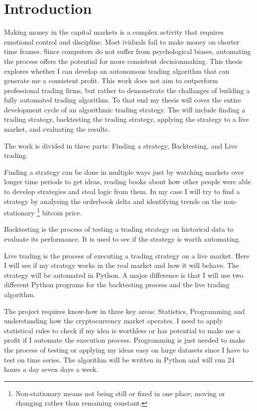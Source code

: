 \documentclass[12pt]{article}
\begin{document}
\section{Introduction}
Making money in the capital markets is a complex activity that requires emotional control and discipline. Most ividuals fail to make money on shorter time frames. Since computers do not suffer from psychological biases, automating the process offers the potential for more consistent decisionmaking. This thesis explores whether I can develop an autonomous trading algorithm that can generate me a consistent profit. 
This work does not aim to outperform professional trading firms, but rather to demonstrate the challanges of building a fully automated trading algorithm.
To that end my thesis will cover the entire development cycle of an algorithmic trading strategy. The will include finding a trading strategy, backtesting the trading strategy, applying the strategy to a live market, and evaluating the results.



The work is divided in three parts: Finding a strategy, Backtesting, and Live trading.

Finding a strategy can be done in multiple ways just by watching markets over longer time periods to get ideas, reading books about how other people were able to develop strategies and steal logic from them. In my case I will try to find a strategy by analysing the orderbook delta and identifying trends on the non-stationary \footnote{Non-stationary means not being still or fixed in one place; moving or changing rather than remaining constant.} bitcoin price. 

Backtesting is the process of testing a trading strategy on historical data to evaluate its performance. It is used to see if the strategy is worth automating.

Live trading is the process of executing a trading strategy on a live market. Here I will see if my strategy works in the real market and how it will behave. The strategy will be automated in Python. A major difference is that I will use two different Python programs for the backtesting process and the live trading algorithm.  


The project requires know-how in three key areas: Statistics, Programming and understanding how the cryptocurrency market operates. I need to apply statistical rules to check if my idea is worthless or has potential to make me a profit if I automate the execution process. Programming is just needed to make the process of testing or applying my ideas easy on large datasets since I have to test on time series. The algorithm will be written in Python and will run 24 hours a day seven days a week.
\end{document}
